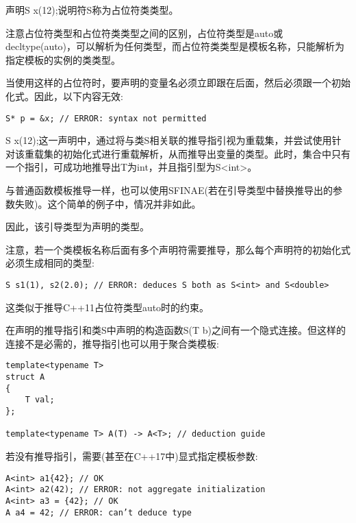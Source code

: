 声明S x(12);说明符S称为占位符类类型。

\begin{tcolorbox}[colback=webgreen!5!white,colframe=webgreen!75!black]
\hspace*{0.75cm}注意占位符类型和占位符类类型之间的区别，占位符类型是auto或decltype(auto)，可以解析为任何类型，而占位符类类型是模板名称，只能解析为指定模板的实例的类类型。
\end{tcolorbox}

当使用这样的占位符时，要声明的变量名必须立即跟在后面，然后必须跟一个初始化式。因此，以下内容无效:
	
\begin{lstlisting}[style=styleCXX]
S* p = &x; // ERROR: syntax not permitted
\end{lstlisting}

S x(12);这一声明中，通过将与类S相关联的推导指引视为重载集，并尝试使用针对该重载集的初始化式进行重载解析，从而推导出变量的类型。此时，集合中只有一个指引，可成功地推导出T为int，并且指引型为S<int>。

\begin{tcolorbox}[colback=webgreen!5!white,colframe=webgreen!75!black]
\hspace*{0.75cm}与普通函数模板推导一样，也可以使用SFINAE(若在引导类型中替换推导出的参数失败)。这个简单的例子中，情况并非如此。
\end{tcolorbox}

因此，该引导类型为声明的类型。

注意，若一个类模板名称后面有多个声明符需要推导，那么每个声明符的初始化式必须生成相同的类型:

\begin{lstlisting}[style=styleCXX]
S s1(1), s2(2.0); // ERROR: deduces S both as S<int> and S<double>
\end{lstlisting}

这类似于推导C++11占位符类型auto时的约束。

在声明的推导指引和类S中声明的构造函数S(T b)之间有一个隐式连接。但这样的连接不是必需的，推导指引也可以用于聚合类模板:

\begin{lstlisting}[style=styleCXX]
template<typename T>
struct A
{
	T val;
};

template<typename T> A(T) -> A<T>; // deduction guide
\end{lstlisting}

若没有推导指引，需要(甚至在C++17中)显式指定模板参数:

\begin{lstlisting}[style=styleCXX]
A<int> a1{42}; // OK
A<int> a2(42); // ERROR: not aggregate initialization
A<int> a3 = {42}; // OK
A a4 = 42; // ERROR: can’t deduce type
\end{lstlisting}

